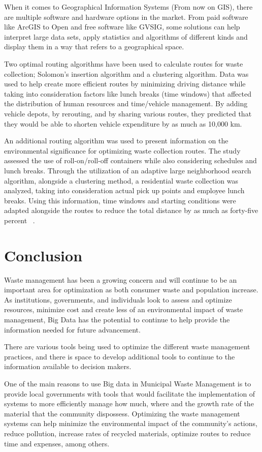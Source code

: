 \documentclass[sigconf]{acmart}
\begin{document}
When it comes to Geographical Information Systems (From now on GIS), there are multiple software and hardware options in the market. From paid software like ArcGIS to Open and free software like GVSIG, some solutions can help interpret large data sets, apply statistics and algorithms of different kinds and display them in a way that refers to a geographical space. 

Two optimal routing algorithms have been used to calculate routes for waste collection; Solomon's insertion algorithm and a clustering algorithm.  Data was used to help create more efficient routes by minimizing driving distance while taking into consideration factors like lunch breaks (time windows) that affected the distribution of human resources and time/vehicle management.  By adding vehicle depots, by rerouting, and by sharing various routes, they predicted that they would be able to shorten vehicle expenditure by as much as 10,000 km.  

An additional routing algorithm was used to present information on the environmental significance for optimizing waste collection routes.  The study assessed the use of roll-on/roll-off containers while also considering schedules and lunch breaks.  Through the utilization of an adaptive large neighborhood search algorithm, alongside a clustering method, a residential waste collection was analyzed, taking into consideration actual pick up points and employee lunch breaks.  Using this information, time windows and starting conditions were adapted alongside the routes to reduce the total distance by as much as forty-five percent ~\cite{shahrokni2014big}.

\section{Conclusion}
Waste management has been a growing concern and will continue to be an important area for optimization as both consumer waste and population increase.  As institutions, governments, and individuals look to assess and optimize resources, minimize cost and create less of an environmental impact of waste management, Big Data has the potential to continue to help provide the information needed for future advancement.

There are various tools being used to optimize the different waste management practices, and there is space to develop additional tools to continue to the information available to decision makers.

One of the main reasons to use Big data in Municipal Waste Management is to provide local governments with tools that would facilitate the implementation of systems to more efficiently manage how much, where and the growth rate of the material that the community dispossess. Optimizing the waste management systems can help minimize the environmental impact of the community's actions, reduce pollution, increase rates of recycled materials, optimize routes to reduce time and expenses, among others.
 
\end{document}
